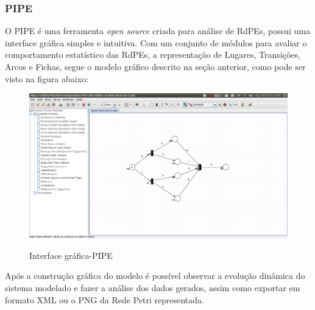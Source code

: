 		\subsubsection{PIPE}
			
			O PIPE\cite{bonet2007pipe} é uma ferramenta \textit{open source} criada para análise de RdPEs, possui uma interface gráfica simples e intuitiva. Com um conjunto de módulos para avaliar o comportamento estatístico das RdPEs, a representação de Lugares, Transições, Arcos e Fichas, segue o modelo gráfico descrito na seção anterior, como pode ser visto na figura abaixo:			
						
			\begin{figure}[h]
				\center
				\caption{Interface gráfica-PIPE}
				\includegraphics[width=1\textwidth]{img/pipe.jpg}
				\label{fig:PIPE}
			\end{figure}						
			
			Após a construção gráfica do modelo é possível observar a evolução dinâmica do sistema modelado e fazer a análise dos dados gerados, assim como exportar em formato XML ou o PNG da Rede Petri representada.

			